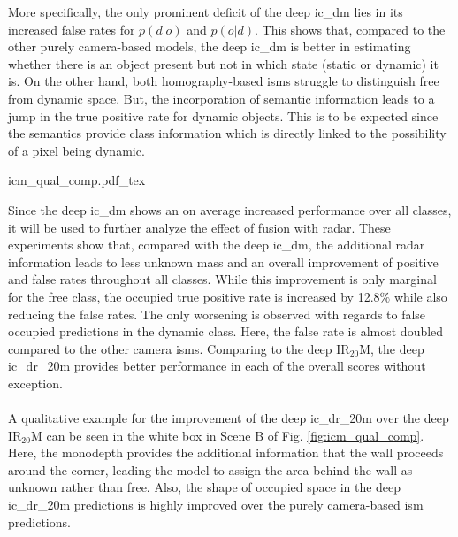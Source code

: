 More specifically, the only prominent deficit of the deep \gls{ic_dm} lies in its increased false rates for $p(d|o)$ and $p(o|d)$. This shows that, compared to the other purely camera-based models, the deep \gls{ic_dm} is better in estimating whether there is an object present but not in which state (static or dynamic) it is. On the other hand, both homography-based \gls{ism}s struggle to distinguish free from dynamic space. But, the incorporation of semantic information leads to a jump in the true positive rate for dynamic objects. This is to be expected since the semantics provide class information which is directly linked to the possibility of a pixel being dynamic.
\begin{center}
	{icm_qual_comp.pdf_tex}
\end{center}
Since the deep \gls{ic_dm} shows an on average increased performance over all classes, it will be used to further analyze the effect of fusion with radar. These experiments show that, compared with the deep \gls{ic_dm}, the additional radar information leads to less unknown mass and an overall improvement of positive and false rates throughout all classes. While this improvement is only marginal for the free class, the occupied true positive rate is increased by 12.8$\%$ while also reducing the false rates. The only worsening is observed with regards to false occupied predictions in the dynamic class. Here, the false rate is almost doubled compared to the other camera \gls{ism}s. Comparing to the deep IR$_{20}$M, the deep \gls{ic_dr_20m} provides better performance in each of the overall scores without exception.
\\\\
A qualitative example for the improvement of the deep \gls{ic_dr_20m} over the deep IR$_{20}$M can be seen in the white box in Scene B of Fig. \ref{fig:icm_qual_comp}. Here, the \gls{monodepth} provides the additional information that the wall proceeds around the corner, leading the model to assign the area behind the wall as unknown rather than free. Also, the shape of occupied space in the deep \gls{ic_dr_20m} predictions is highly improved over the purely camera-based \gls{ism} predictions.
%
